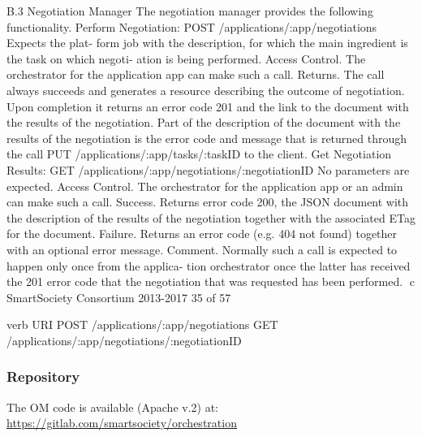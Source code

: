 B.3 Negotiation Manager
The negotiation manager provides the following functionality.
Perform Negotiation: POST /applications/:app/negotiations Expects the plat- form job with the description, for which the main ingredient is the task on which negoti- ation is being performed.
Access Control. The orchestrator for the application app can make such a call.
Returns. The call always succeeds and generates a resource describing the outcome of negotiation. Upon completion it returns an error code 201 and the link to the document with the results of the negotiation. Part of the description of the document with the results of the negotiation is the error code and message that is returned through the call PUT /applications/:app/tasks/:taskID to the client.
Get Negotiation Results:
GET /applications/:app/negotiations/:negotiationID No parameters are expected.
Access Control. The orchestrator for the application app or an admin can make such a call.
Success. Returns error code 200, the JSON document with the description of the results of the negotiation together with the associated ETag for the document.
Failure. Returns an error code (e.g. 404 not found) together with an optional error message.
Comment. Normally such a call is expected to happen only once from the applica- tion orchestrator once the latter has received the 201 error code that the negotiation that was requested has been performed.
⃝c SmartSociety Consortium 2013-2017 35 of 57
 
verb
URI
POST
/applications/:app/negotiations
GET
/applications/:app/negotiations/:negotiationID



\subsubsection{Repository}
The OM code is available (Apache v.2) at: \url{https://gitlab.com/smartsociety/orchestration}